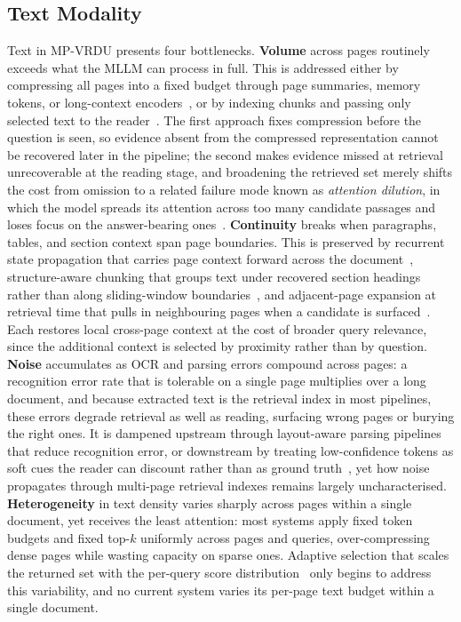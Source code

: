 \subsection{Text Modality}
\label{sec:modality-text}
Text in MP-VRDU presents four bottlenecks. \textbf{Volume} across pages routinely exceeds what the MLLM can process in full. This is addressed either by compressing all pages into a fixed budget through page summaries, memory tokens, or long-context encoders~\cite{borchmann2025arctic, dong2024multi, hu2025mplug}, or by indexing chunks and passing only selected text to the reader~\cite{xie2026pdf, zhang2024cream, cho2024m3docrag}. The first approach fixes compression before the question is seen, so evidence absent from the compressed representation cannot be recovered later in the pipeline; the second makes evidence missed at retrieval unrecoverable at the reading stage, and broadening the retrieved set merely shifts the cost from omission to a related failure mode known as \emph{attention dilution}, in which the model spreads its attention across too many candidate passages and loses focus on the answer-bearing ones~\cite{liu2024lost}. \textbf{Continuity} breaks when paragraphs, tables, and section context span page boundaries. This is preserved by recurrent state propagation that carries page context forward across the document~\cite{dong2024multi}, structure-aware chunking that groups text under recovered section headings rather than along sliding-window boundaries~\cite{shin2026multidocfusion}, and adjacent-page expansion at retrieval time that pulls in neighbouring pages when a candidate is surfaced~\cite{qian2026accurate}. Each restores local cross-page context at the cost of broader query relevance, since the additional context is selected by proximity rather than by question. \textbf{Noise} accumulates as OCR and parsing errors compound across pages: a recognition error rate that is tolerable on a single page multiplies over a long document, and because extracted text is the retrieval index in most pipelines, these errors degrade retrieval as well as reading, surfacing wrong pages or burying the right ones. It is dampened upstream through layout-aware parsing pipelines that reduce recognition error, or downstream by treating low-confidence tokens as soft cues the reader can discount rather than as ground truth~\cite{hannan2026docslm}, yet how noise propagates through multi-page retrieval indexes remains largely uncharacterised. \textbf{Heterogeneity} in text density varies sharply across pages within a single document, yet receives the least attention: most systems apply fixed token budgets and fixed top-$k$ uniformly across pages and queries, over-compressing dense pages while wasting capacity on sparse ones. Adaptive selection that scales the returned set with the per-query score distribution~\cite{li2026avir} only begins to address this variability, and no current system varies its per-page text budget within a single document.

